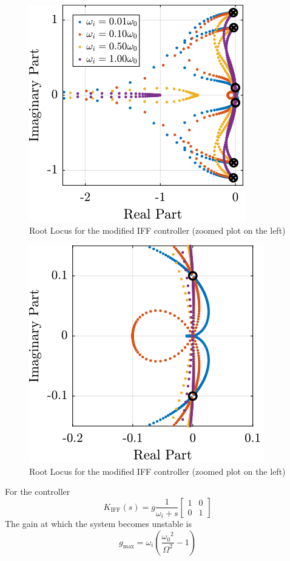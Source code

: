 \documentclass[a4paper, 10pt, DIV=12, parskip=full]{scrreprt}
\begin{document}
\begin{figure}[htbp]
\centering
\includegraphics[scale=1]{figs/root_locus_wi_modified_iff.png}
\caption{\label{fig:root_locus_wi_modified_iff}Root Locus for the modified IFF controller (zoomed plot on the left)}
\end{figure}

\begin{figure}[htbp]
\centering
\includegraphics[scale=1]{figs/root_locus_wi_modified_iff_zoom.png}
\caption{\label{fig:root_locus_wi_modified_iff_zoom}Root Locus for the modified IFF controller (zoomed plot on the left)}
\end{figure}

For the controller
\begin{equation}
  K_{\text{IFF}}(s) = g\frac{1}{\omega_i + s} \begin{bmatrix}
  1 & 0 \\
  0 & 1
\end{bmatrix}
\end{equation}
The gain at which the system becomes unstable is
\begin{equation}
  g_\text{max} = \omega_i \left( \frac{{\omega_0}^2}{\Omega^2} - 1 \right) \label{eq:iff_gmax}
\end{equation}
\end{document}
